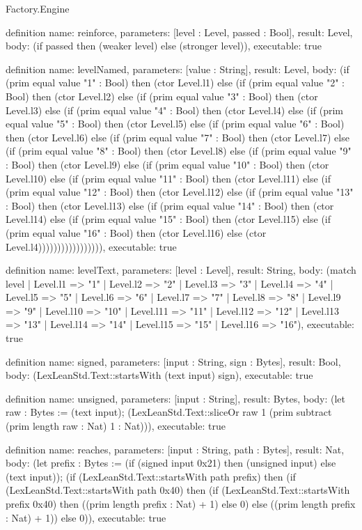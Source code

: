\begin{lexlean}{Factory.Engine}
\begin{semanticmodule}
definition{
  name: reinforce,
  parameters: [level : Level, passed : Bool],
  result: Level,
  body: (if passed then (weaker level) else (stronger level)),
  executable: true
}

definition{
  name: levelNamed,
  parameters: [value : String],
  result: Level,
  body: (if (prim equal value "1" : Bool) then (ctor Level.l1) else (if (prim equal value "2" : Bool) then (ctor Level.l2) else (if (prim equal value "3" : Bool) then (ctor Level.l3) else (if (prim equal value "4" : Bool) then (ctor Level.l4) else (if (prim equal value "5" : Bool) then (ctor Level.l5) else (if (prim equal value "6" : Bool) then (ctor Level.l6) else (if (prim equal value "7" : Bool) then (ctor Level.l7) else (if (prim equal value "8" : Bool) then (ctor Level.l8) else (if (prim equal value "9" : Bool) then (ctor Level.l9) else (if (prim equal value "10" : Bool) then (ctor Level.l10) else (if (prim equal value "11" : Bool) then (ctor Level.l11) else (if (prim equal value "12" : Bool) then (ctor Level.l12) else (if (prim equal value "13" : Bool) then (ctor Level.l13) else (if (prim equal value "14" : Bool) then (ctor Level.l14) else (if (prim equal value "15" : Bool) then (ctor Level.l15) else (if (prim equal value "16" : Bool) then (ctor Level.l16) else (ctor Level.l4))))))))))))))))),
  executable: true
}

definition{
  name: levelText,
  parameters: [level : Level],
  result: String,
  body: (match level
    | Level.l1 => "1"
    | Level.l2 => "2"
    | Level.l3 => "3"
    | Level.l4 => "4"
    | Level.l5 => "5"
    | Level.l6 => "6"
    | Level.l7 => "7"
    | Level.l8 => "8"
    | Level.l9 => "9"
    | Level.l10 => "10"
    | Level.l11 => "11"
    | Level.l12 => "12"
    | Level.l13 => "13"
    | Level.l14 => "14"
    | Level.l15 => "15"
    | Level.l16 => "16"),
  executable: true
}

definition{
  name: signed,
  parameters: [input : String, sign : Bytes],
  result: Bool,
  body: (LexLeanStd.Text::startsWith (text input) sign),
  executable: true
}

definition{
  name: unsigned,
  parameters: [input : String],
  result: Bytes,
  body: (let raw : Bytes := (text input); (LexLeanStd.Text::sliceOr raw 1 (prim subtract (prim length raw : Nat) 1 : Nat))),
  executable: true
}

definition{
  name: reaches,
  parameters: [input : String, path : Bytes],
  result: Nat,
  body: (let prefix : Bytes := (if (signed input 0x21) then (unsigned input) else (text input)); (if (LexLeanStd.Text::startsWith path prefix) then (if (LexLeanStd.Text::startsWith path 0x40) then (if (LexLeanStd.Text::startsWith prefix 0x40) then ((prim length prefix : Nat) + 1) else 0) else ((prim length prefix : Nat) + 1)) else 0)),
  executable: true
}


\end{semanticmodule}
\end{lexlean}
